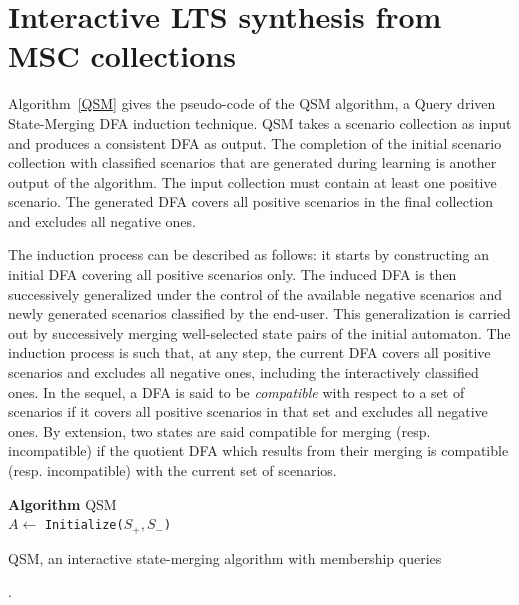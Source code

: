 \section{Interactive LTS synthesis from MSC collections\label{section:lts-induction-from-mscs}}

Algorithm~\ref{QSM} gives the pseudo-code of the \textsc{QSM} algorithm, a Query driven State-Merging DFA induction technique. \textsc{QSM} takes a scenario collection as input and produces a consistent DFA as output. The completion of the initial scenario collection with classified scenarios that are generated during learning is another output of the algorithm. The input collection must contain at least one positive scenario. The generated DFA covers all positive scenarios in the final collection and excludes all negative ones. 

The induction process can be described as follows: it starts by constructing an initial DFA covering all positive scenarios only. The induced DFA is then successively generalized under the control of the available negative scenarios and newly generated scenarios classified by the end-user. This generalization is carried out by successively merging well-selected state pairs of the initial automaton. The induction process is such that, at any step, the current DFA covers all positive scenarios and excludes all negative ones, including the interactively classified ones. In the sequel, a DFA is said to be \textsl{compatible} with respect to a set of scenarios if it covers all positive scenarios in that set and excludes all negative ones. By extension, two states are said compatible for merging (resp. incompatible) if the quotient DFA which results from their merging is compatible (resp. incompatible) with the current set of scenarios.

\begin{algorithm}[H]
{
\textbf{Algorithm} \textsc{QSM}\\
$A \leftarrow $ {\tt Initialize($S_+, S_-$)}\\
}
\caption{\textsc{QSM}, an interactive state-merging algorithm with membership queries\label{QSM}}.
\end{algorithm}

